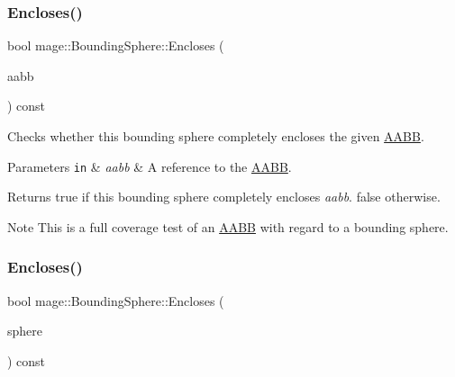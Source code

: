 \subsubsection{\texorpdfstring{Encloses()}{Encloses()}\hspace{0.1cm}{\footnotesize\ttfamily [3/4]}}
{\footnotesize\ttfamily bool mage\+::\+Bounding\+Sphere\+::\+Encloses (\begin{DoxyParamCaption}\item[{const \hyperlink{classmage_1_1_a_a_b_b}{A\+A\+BB} \&}]{aabb }\end{DoxyParamCaption}) const\hspace{0.3cm}{\ttfamily [noexcept]}}

Checks whether this bounding sphere completely encloses the given \hyperlink{classmage_1_1_a_a_b_b}{A\+A\+BB}.


\begin{DoxyParams}[1]{Parameters}
\mbox{\tt in}  & {\em aabb} & A reference to the \hyperlink{classmage_1_1_a_a_b_b}{A\+A\+BB}. \\
\hline
\end{DoxyParams}
\begin{DoxyReturn}{Returns}
{\ttfamily true} if this bounding sphere completely encloses {\itshape aabb}. {\ttfamily false} otherwise. 
\end{DoxyReturn}
\begin{DoxyNote}{Note}
This is a full coverage test of an \hyperlink{classmage_1_1_a_a_b_b}{A\+A\+BB} with regard to a bounding sphere. 
\end{DoxyNote}
\hypertarget{classmage_1_1_bounding_sphere_ac5989739e15d3525bbb805f9c457ad4d}{}\label{classmage_1_1_bounding_sphere_ac5989739e15d3525bbb805f9c457ad4d} 
\subsubsection{\texorpdfstring{Encloses()}{Encloses()}\hspace{0.1cm}{\footnotesize\ttfamily [4/4]}}
{\footnotesize\ttfamily bool mage\+::\+Bounding\+Sphere\+::\+Encloses (\begin{DoxyParamCaption}\item[{const \hyperlink{classmage_1_1_bounding_sphere}{Bounding\+Sphere} \&}]{sphere }\end{DoxyParamCaption}) const\hspace{0.3cm}{\ttfamily [noexcept]}}

